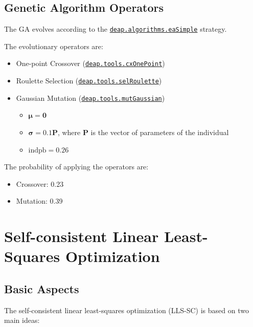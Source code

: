 \documentclass[10pt,a4paper,openany]{memoir}
\numberwithin{equation}{section}
\begin{document}
\subsection{Genetic Algorithm Operators}
\label{sec:ga-evolutionary-operators}

The GA evolves according to the \href{https://deap.readthedocs.io/en/master/api/algo.html#deap.algorithms.eaSimple}{\texttt{deap.algorithms.eaSimple}} strategy.

The evolutionary operators are:
\begin{itemize}
  \item One-point Crossover (\href{https://deap.readthedocs.io/en/master/api/tools.html#deap.tools.cxOnePoint}{\texttt{deap.tools.cxOnePoint}})
  \item Roulette Selection (\href{https://deap.readthedocs.io/en/master/api/tools.html#deap.tools.selRoulette}{\texttt{deap.tools.selRoulette}})
  \item Gaussian Mutation (\href{https://deap.readthedocs.io/en/master/api/tools.html#deap.tools.mutGaussian}{\texttt{deap.tools.mutGaussian}})
    \begin{itemize}
    \item $\boldsymbol{\mu} = \boldsymbol{0}$
    \item $\boldsymbol{\sigma} = 0.1\mathbf{P}$, where $\mathbf{P}$ is the vector of parameters of the individual
      \item $\text{indpb} = 0.26$
    \end{itemize}
\end{itemize}
The probability of applying the operators are:
\begin{itemize}
\item Crossover: 0.23
\item Mutation: 0.39
\end{itemize}

\section{Self-consistent Linear Least-Squares Optimization}

\subsection{Basic Aspects}

The self-consistent linear least-squares optimization (LLS-SC) is
based on two main ideas:
\end{document}
